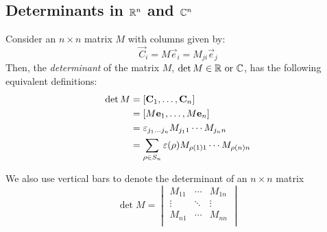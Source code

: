 \documentclass[../main.tex]{subfiles}
\begin{document}
\subsection{Determinants in \texorpdfstring{$\mathbb{R}^{n}$ and $\mathbb{C}^{n}$}{n Dimensions}}
\begin{definition}[Determinant]
  Consider an $n \times n$  matrix $M$ with columns given by:
  \[
    \vec{C}_i = M\vec{e}_i = M_{j i}\vec{e}_j
  \]
  Then, the \textit{determinant} of the matrix $M$, $\det M \in \mathbb{R} \text{ or } \mathbb{C}$, has the following equivalent definitions:
  \begin{align*}
    \det M &= [\mathbf{\bm{C}}_1, \ldots, \mathbf{\bm{C}}_n] \\
           &= [M\mathbf{\bm{e}}_1, \ldots, M\mathbf{\bm{e}}_n] \\
           &= \varepsilon_{j_1 \ldots j_n} M_{j_1 1} \cdots M_{j_n n} \\
           &= \sum_{\rho \in S_n} \varepsilon(\rho) M_{\rho(1) 1} \cdots M_{\rho(n) n}
  \end{align*}
\end{definition}
\begin{remark}[Notation]
We also use vertical bars to denote the determinant of an $n \times n$  matrix
\[
  \det M =
  \begin{vmatrix}
  M_{1 1} & \cdots & M_{1 n} \\
  \vdots & \ddots & \vdots \\
  M_{n 1} & \cdots & M_{n n} \\
  \end{vmatrix}
\]
\end{remark}
\end{document}
